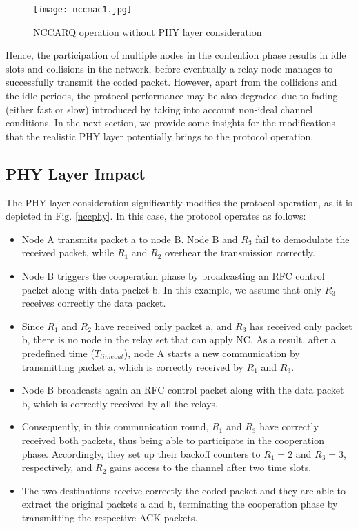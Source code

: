 \documentclass[12pt,draftcls, onecolumn]{IEEEtran}
\begin{document}
\begin{figure}[htb]
\centering
\texttt{[image: nccmac1.jpg]}
\caption{NCCARQ operation without PHY layer consideration}\label{nccmac}
\end{figure}

Hence, the participation of multiple nodes in the contention phase results in idle slots and collisions in the network, before eventually a relay node manages to successfully transmit the coded packet. However, apart from the collisions and the idle periods, the protocol performance may be also degraded due to fading (either fast or slow) introduced by taking into account non-ideal channel conditions. In the next section, we provide some insights for the modifications that the realistic PHY layer potentially brings to the protocol operation.

\subsection{PHY Layer Impact}
\label{sec:phy}

The PHY layer consideration significantly modifies the protocol operation, as it is depicted in Fig. \ref{nccphy}. In this case, the protocol operates as follows:
\begin{itemize}
  \item Node A transmits packet a to node B. Node B and $R_3$ fail to demodulate the received packet, while $R_1$ and $R_2$ overhear the transmission correctly.
  \item Node B triggers the cooperation phase by broadcasting an RFC control packet along with data packet b. In this example, we assume that only $R_3$ receives correctly the data packet.
  \item Since $R_1$ and $R_2$ have received only packet a, and $R_3$ has received only packet b, there is no node in the relay set that can apply NC. As a result, after a predefined time ($T_{timeout}$), node A starts a new communication by transmitting packet a, which is correctly received by $R_1$ and $R_3$.
  \item Node B broadcasts again an RFC control packet along with the data packet b, which is correctly received by all the relays.
  \item Consequently, in this communication round, $R_1$ and $R_3$ have correctly received both packets, thus being able to participate in the cooperation phase. Accordingly, they set up their backoff counters to $R_1=2$ and $R_3=3$, respectively, and $R_2$ gains access to the channel after two time slots.
  \item The two destinations receive correctly the coded packet and they are able to extract the original packets a and b, terminating the cooperation phase by transmitting the respective ACK packets.
\end{itemize}
\end{document}
